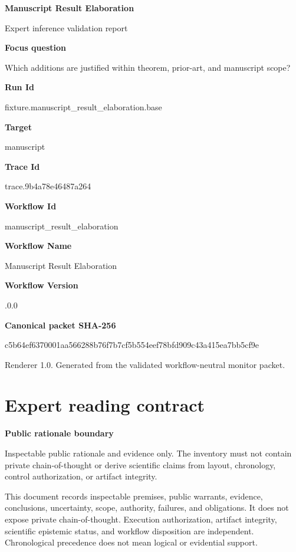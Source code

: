\documentclass[10pt,a4paper]{article}
\newcommand{\TraceField}[2]{\par\noindent\textbf{#1}\par\noindent #2\par\smallskip}
\begin{document}
\hypersetup{pageanchor=false}
\begin{titlepage}
\centering
{\LARGE\bfseries Manuscript\allowbreak{} Result Elaboratio\allowbreak{}n\par}
\vspace{1em}
{\large Expert inference validation report\par}
\vspace{2em}
\begin{minipage}{0.92\linewidth}
\TraceField{Focus question}{Which additions are justified within theorem, prior-\allowbreak{}art, and manuscript\allowbreak{} scope?}

\TraceField{Run Id}{fixture.\allowbreak{}manuscript\allowbreak{}\_\allowbreak{}result\_\allowbreak{}elaboratio\allowbreak{}n.\allowbreak{}base}

\TraceField{Target}{manuscript\allowbreak{}}

\TraceField{Trace Id}{trace.\allowbreak{}9b4a78e464\allowbreak{}87a264}

\TraceField{Workflow Id}{manuscript\allowbreak{}\_\allowbreak{}result\_\allowbreak{}elaboratio\allowbreak{}n}

\TraceField{Workflow Name}{Manuscript\allowbreak{} Result Elaboratio\allowbreak{}n}

\TraceField{Workflow Version}{1.\allowbreak{}0.\allowbreak{}0}

\TraceField{Canonical packet SHA-256}{c5b64ef637\allowbreak{}0001aa5662\allowbreak{}88b76f7b7c\allowbreak{}f5b554eef7\allowbreak{}8bfd909c43\allowbreak{}a415ea7bb5\allowbreak{}cf9e}

\end{minipage}
\vfill
{\small Renderer 1.0. Generated from the validated workflow-neutral monitor packet.}
\end{titlepage}
\tableofcontents\clearpage
\hypersetup{pageanchor=true}
\section{Expert reading contract}\label{sec-reading-contract}
\TraceField{Public rationale boundary}{Inspectabl\allowbreak{}e public rationale and evidence only.\allowbreak{} The inventory must not contain private chain-\allowbreak{}of-\allowbreak{}thought or derive scientific\allowbreak{} claims from layout, chronology\allowbreak{}, control authorizat\allowbreak{}ion, or artifact integrity.\allowbreak{}}

This document records inspectable premises, public warrants, evidence, conclusions,
uncertainty, scope, authority, failures, and obligations. It does not expose private
chain-of-thought. Execution authorization, artifact integrity, scientific epistemic
status, and workflow disposition are independent. Chronological precedence does not
mean logical or evidential support.
\end{document}
